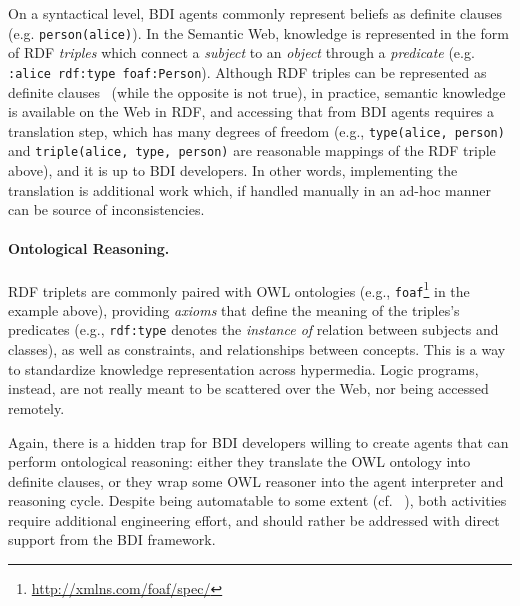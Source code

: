 \documentclass[
]{ceurart}
\begin{document}
On a syntactical level,
\ac{BDI} agents commonly represent beliefs as definite clauses~\cite{MAKOWSKY1987266}%
(e.g. \texttt{person(alice)}).
%
In the Semantic Web,
knowledge is represented in the form of \ac{RDF} \emph{triples} which connect a \emph{subject} to an \emph{object} through a \emph{predicate} (e.g. \texttt{:alice rdf:type foaf:Person}).
%
Although \ac{RDF} triples can be represented as definite clauses~\cite{DBLP:conf/www/GrosofHVD03}
(while the opposite is not true),
in practice,
semantic knowledge is available on the Web in \ac{RDF},
and accessing that from \ac{BDI} agents requires a translation step,
which has many degrees of freedom
(e.g., \texttt{type(alice, person)} and \texttt{triple(alice, type, person)} are reasonable mappings of the \ac{RDF} triple above),
and it is up to \ac{BDI} developers.
%
In other words,
implementing the translation is additional work which, if handled manually in an ad-hoc manner can be source of inconsistencies.

\paragraph{Ontological Reasoning.}

\ac{RDF} triplets are commonly paired with \ac{OWL} ontologies (e.g., \texttt{foaf}\footnote{\url{http://xmlns.com/foaf/spec/}} in the example above),
providing \emph{axioms} that define the meaning of the triples's predicates
(e.g., \texttt{rdf:type} denotes the \emph{instance of} relation between subjects and classes),
as well as constraints, and relationships between concepts.
%
This is a way to standardize knowledge representation across hypermedia.
%
Logic programs, instead, are not really meant to be scattered over the Web,
nor being accessed remotely.

Again,
there is a hidden trap for \ac{BDI} developers willing to create agents that can perform ontological reasoning:
either they translate the \ac{OWL} ontology into definite clauses,
or they wrap some \ac{OWL} reasoner into the agent interpreter and reasoning cycle.
%
Despite being automatable to some extent (cf. ~\cite{samuel2008tplp}),
both activities require additional engineering effort,
and should rather be addressed with direct support from the \ac{BDI} framework.
\end{document}

